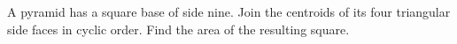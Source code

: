 A pyramid has a square base of side nine. Join the centroids of its four triangular side faces in cyclic order. Find the area of the resulting square.
